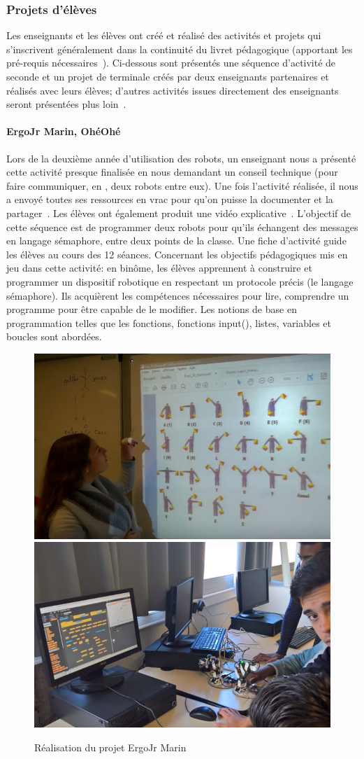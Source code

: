         \subsubsection{Projets d'élèves}
            Les enseignants et les élèves ont créé et réalisé des activités et projets qui s'inscrivent généralement dans la continuité du livret pédagogique (apportant les pré-requis nécessaires~). Ci-dessous sont présentés une séquence d'activité de seconde  et un projet de terminale  créés par deux enseignants partenaires et réalisés avec leurs élèves; d'autres activités issues directement des enseignants seront présentées plus loin~.
            \paragraph{ErgoJr Marin, OhéOhé}
                Lors de la deuxième année d'utilisation des robots, un enseignant nous a présenté cette activité presque finalisée en nous demandant un conseil technique (pour faire communiquer, en , deux robots entre eux). Une fois l'activité réalisée, il nous a envoyé toutes ses ressources en vrac pour qu'on puisse la documenter et la partager~. Les élèves ont également produit une vidéo explicative~. 
                L'objectif de cette séquence est de programmer deux robots pour qu'ils échangent des messages en langage sémaphore, entre deux points de la classe. Une fiche d’activité guide les élèves au cours des 12 séances.
                Concernant les objectifs pédagogiques mis en jeu dans cette activité: en binôme, les élèves apprennent à construire et programmer un dispositif robotique en respectant un protocole précis (le langage sémaphore). Ils acquièrent les compétences nécessaires pour lire, comprendre un programme pour être capable de le modifier. Les notions de base en programmation telles que les fonctions, fonctions input(), listes, variables et boucles sont abordées. 
                \begin{figure}[!h]
                  \centering
                  \includegraphics[width=0.49\linewidth]{Figures/Noirpoudre-Semaphore.png}
                  \includegraphics[width=0.49\linewidth]{Figures/Noirpoudre-semaphore_prog.png}
                  \caption{Réalisation du projet ErgoJr Marin}\label{fig:act_semaphore}
                \end{figure} 
